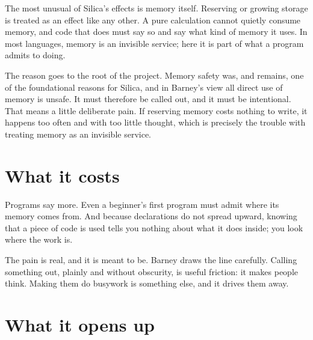 The most unusual of Silica's effects is memory itself. Reserving or growing
storage is treated as an effect like any other. A pure calculation cannot
quietly consume memory, and code that does must say so and say what kind of
memory it uses. In most languages, memory is an invisible service; here it is
part of what a program admits to doing.

The reason goes to the root of the project. Memory safety was, and remains, one
of the foundational reasons for Silica, and in Barney's view all direct use of
memory is unsafe. It must therefore be called out, and it must be intentional.
That means a little deliberate pain. If reserving memory costs nothing to write,
it happens too often and with too little thought, which is precisely the trouble
with treating memory as an invisible service.

\section{What it costs}

Programs say more. Even a beginner's first program must admit where its memory
comes from. And because declarations do not spread upward, knowing that a piece
of code is used tells you nothing about what it does inside; you look where the
work is.

The pain is real, and it is meant to be. Barney draws the line carefully.
Calling something out, plainly and without obscurity, is useful friction: it
makes people think. Making them do busywork is something else, and it drives
them away.
\section{What it opens up}

